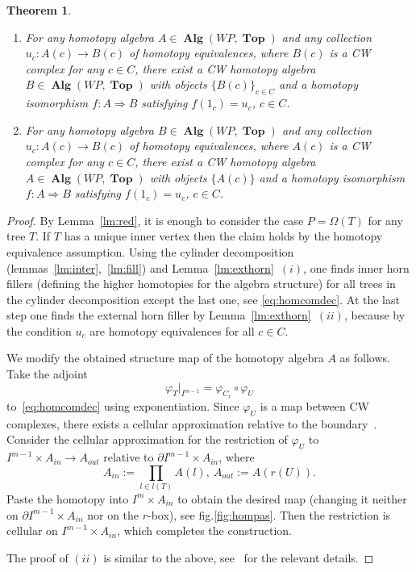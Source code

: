 \documentclass{amsart}
\newtheorem{theorem}[formula]{Theorem}
\theoremstyle{definition}
\theoremstyle{remark}
\newcommand{\lb}{\lbrace}
\newcommand{\rb}{\rbrace}
\DeclareMathOperator{\Top}{\mathbf{Top}}
\DeclareMathOperator{\Alg}{\mathbf{Alg}}
\renewcommand{\phi}{\varphi}
\begin{document}
	\begin{theorem}\label{thm:gen}
		\begin{enumerate}[label=(\roman*)]
			\item For any homotopy algebra $A\in\Alg(WP,\Top)$ and any collection $u_{c}\colon A(c)\to B(c)$ of homotopy equivalences, where $B(c)$ is a CW complex for any $c\in C$, there exist a CW homotopy algebra $B\in\Alg(WP,\Top)$ with objects $\lb B(c)\rb_{c\in C}$ and a homotopy isomorphism $f\colon A\Rightarrow B$ satisfying $f(1_{c})=u_{c}$, $c\in C$.
			\item For any homotopy algebra $B\in\Alg(WP,\Top)$ and any collection $u_{c}\colon A(c)\to B(c)$ of homotopy equivalences, where $A(c)$ is a CW complex for any $c\in C$, there exist a CW homotopy algebra $A\in\Alg(WP,\Top)$ with objects $\lb A(c)\rb$ and a homotopy isomorphism $f\colon A\Rightarrow B$ satisfying $f(1_{c})=u_{c}$, $c\in C$.
		\end{enumerate}
	\end{theorem}
	\begin{proof}
		By Lemma~\ref{lm:red}, it is enough to consider the case $P= \Omega(T)$ for any tree $T$.
		If $T$ has a unique inner vertex then the claim holds by the homotopy equivalence assumption.
		Using the cylinder decomposition (lemmas~\ref{lm:inter},~\ref{lm:fill}) and Lemma~\ref{lm:exthorn}~$(i)$, one finds inner horn fillers (defining the higher homotopies for the algebra structure) for all trees in the cylinder decomposition except the last one, see \eqref{eq:homcomdec}.
		At the last step one finds the external horn filler by Lemma~\ref{lm:exthorn}~$(ii)$, because by the condition $u_{c}$ are homotopy equivalences for all $c\in C$.
		
		We modify the obtained structure map of the homotopy algebra $A$ as follows.
		Take the adjoint 
		\[
		\phi_{T}|_{I^{m-1}}=\phi_{C_{r}}\circ \phi_{U}
		\]
		to~\eqref{eq:homcomdec} using exponentiation.
		Since $\phi_{U}$ is a map between CW complexes, there exists a cellular approximation relative to the boundary~\cite[Theorem~4.8]{ha-01}.
		Consider the cellular approximation for the restriction of $\phi_{U}$ to $I^{m-1}\times A_{in}\to A_{out}$ relative to $\partial I^{m-1}\times A_{in}$, where
		\[
		A_{in}:=\prod_{l\in l(T)}A(l),\ 
		A_{out}:=A(r(U)).
		\]
		Paste the homotopy into $I^{m}\times A_{in}$ to obtain the desired map (changing it neither on $\partial I^{m-1}\times A_{in}$ nor on the $r$-box), see fig.\ref{fig:hompas}.
		Then the restriction is cellular on $I^{m-1}\times A_{in}$, which completes the construction.
		
		The proof of $(ii)$ is similar to the above, see~\cite[Appendix B]{ci-mo-11} for the relevant details.
	\end{proof}
	
\end{document}
